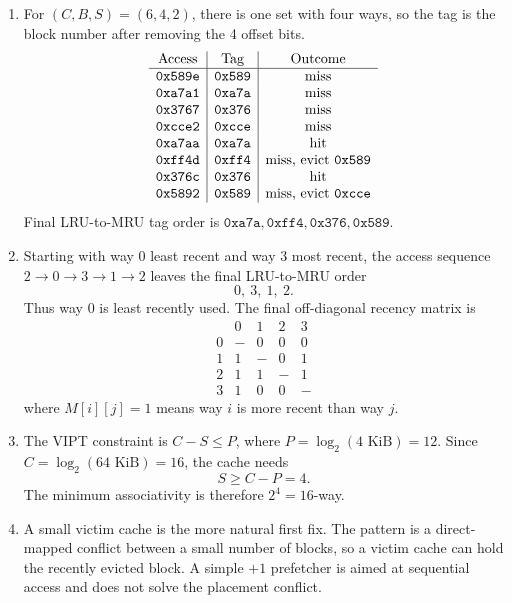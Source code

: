 \documentclass[11pt]{article}
\begin{document}
\begin{enumerate}
    \item For \((C,B,S)=(6,4,2)\), there is one set with four ways, so the tag is the block number after removing the 4 offset bits.
    \[
    \begin{array}{c|c|c}
        \text{Access} & \text{Tag} & \text{Outcome}\\
        \hline
        \texttt{0x589e} & \texttt{0x589} & \text{miss}\\
        \texttt{0xa7a1} & \texttt{0xa7a} & \text{miss}\\
        \texttt{0x3767} & \texttt{0x376} & \text{miss}\\
        \texttt{0xcce2} & \texttt{0xcce} & \text{miss}\\
        \texttt{0xa7aa} & \texttt{0xa7a} & \text{hit}\\
        \texttt{0xff4d} & \texttt{0xff4} & \text{miss, evict \texttt{0x589}}\\
        \texttt{0x376c} & \texttt{0x376} & \text{hit}\\
        \texttt{0x5892} & \texttt{0x589} & \text{miss, evict \texttt{0xcce}}
    \end{array}
    \]
    Final LRU-to-MRU tag order is \(\texttt{0xa7a}, \texttt{0xff4}, \texttt{0x376}, \texttt{0x589}\).

    \item Starting with way 0 least recent and way 3 most recent, the access sequence \(2\rightarrow0\rightarrow3\rightarrow1\rightarrow2\) leaves the final LRU-to-MRU order
    \[
        0,\ 3,\ 1,\ 2.
    \]
    Thus way 0 is least recently used.
    The final off-diagonal recency matrix is
    \[
    \begin{array}{c|cccc}
        &0&1&2&3\\
        \hline
        0&-&0&0&0\\
        1&1&-&0&1\\
        2&1&1&-&1\\
        3&1&0&0&-
    \end{array}
    \]
    where \(M[i][j]=1\) means way \(i\) is more recent than way \(j\).

    \item The VIPT constraint is \(C-S\le P\), where \(P=\log_2(4\text{ KiB})=12\).
    Since \(C=\log_2(64\text{ KiB})=16\), the cache needs
    \[
        S\ge C-P=4.
    \]
    The minimum associativity is therefore \(2^4=16\)-way.

    \item A small victim cache is the more natural first fix.
    The pattern is a direct-mapped conflict between a small number of blocks, so a victim cache can hold the recently evicted block.
    A simple \(+1\) prefetcher is aimed at sequential access and does not solve the placement conflict.


\end{enumerate}
\end{document}
